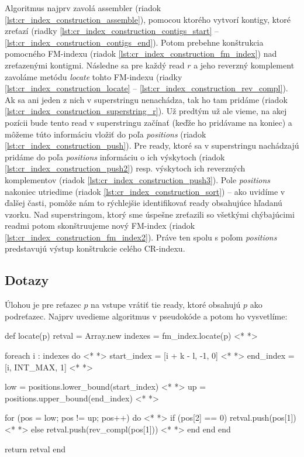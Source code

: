 Algoritmus najprv zavolá assembler (riadok \ref{lst:cr_index_construction_assemble}), pomocou ktorého vytvorí kontigy, ktoré zreťazí (riadky \ref{lst:cr_index_construction_contigs_start} -- \ref{lst:cr_index_construction_contigs_end}). Potom prebehne konštrukcia pomocného FM-indexu (riadok \ref{lst:cr_index_construction_fm_index}) nad zreťazenými kontigmi. Následne sa pre každý read $r$ a jeho reverzný komplement zavoláme metódu \emph{locate} tohto FM-indexu (riadky \ref{lst:cr_index_construction_locate} -- \ref{lst:cr_index_construction_rev_compl}). Ak sa ani jeden z nich v superstringu nenachádza, tak ho tam pridáme (riadok \ref{lst:cr_index_construction_superstring_r}). Už predtým už ale vieme, na akej pozícii bude tento read v superstringu začínať (keďže ho pridávame na koniec) a môžeme túto informáciu vložiť do poľa \emph{positions} (riadok \ref{lst:cr_index_construction_push}). Pre ready, ktoré sa v superstringu nachádzajú pridáme do poľa \emph{positions} informáciu o ich výskytoch (riadok \ref{lst:cr_index_construction_push2}) resp. výskytoch ich reverzných komplementov (riadok \ref{lst:cr_index_construction_push3}). Pole \emph{positions} nakoniec utriedime (riadok \ref{lst:cr_index_construction_sort}) -- ako uvidíme v ďalšej časti, pomôže nám to rýchlejšie identifikovať ready obsahujúce hľadanú vzorku. Nad superstringom, ktorý sme úspešne zreťazili so všetkými chýbajúcimi readmi potom skonštruujeme nový FM-index (riadok \ref{lst:cr_index_construction_fm_index2}). Práve ten spolu s poľom \emph{positions} predstavujú výstup konštrukcie celého CR-indexu.

\subsection{Dotazy}
Úlohou je pre reťazec $p$ na vstupe vrátiť tie ready, ktoré obsahujú $p$ ako podreťazec. Najprv uvedieme algoritmus v pseudokóde a potom ho vysvetlíme:

\bigskip
\begin{pseudocode}[label=lst:cr_index_query,caption={Algoritmus dotazu \emph{locate} CR-indexu nad readmi bez chýb.}]
def locate(p)
  retval = Array.new
  indexes = fm_index.locate(p) <* \label{lst:cr_index_query_locate} *>  
  
  foreach i : indexes do <* \label{lst:cr_index_query_foreach} *>  
    start_index = [i + k - l, -1, 0] <* \label{lst:cr_index_query_start_index} *>  
    end_index = [i, INT_MAX, 1] <* \label{lst:cr_index_query_end_index} *>  
    
    low = positions.lower_bound(start_index) <* \label{lst:cr_index_query_low} *>  
    up = positions.upper_bound(end_index) <* \label{lst:cr_index_query_up} *>  
    
    for (pos = low; pos != up; pos++) do <* \label{lst:cr_index_query_foreach2} *>
      if (pos[2] == 0)
        retval.push(pos[1]) <* \label{lst:cr_index_query_push_read} *>
      else
        retval.push(rev_compl(pos[1])) <* \label{lst:cr_index_query_push_rev_compl} *>
      end
    end
  end
  
  return retval
end
\end{pseudocode}
\bigskip

